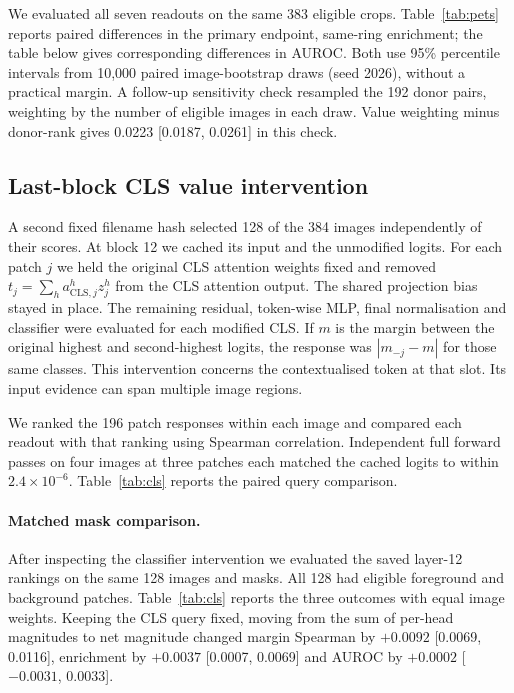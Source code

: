 We evaluated all seven readouts on the same 383 eligible crops. Table~\ref{tab:pets} reports paired differences in the primary endpoint, same-ring enrichment; the table below gives corresponding differences in AUROC. Both use 95\% percentile intervals from 10,000 paired image-bootstrap draws (seed 2026), without a practical margin. A follow-up sensitivity check resampled the 192 donor pairs, weighting by the number of eligible images in each draw. Value weighting minus donor-rank gives 0.0223 [0.0187, 0.0261] in this check.
\begin{center}\begin{minipage}{\linewidth}
\centering\small\setlength{\tabcolsep}{4pt}
\end{minipage}\end{center}

\subsection{Last-block CLS value intervention}
A second fixed filename hash selected 128 of the 384 images independently of their scores. At block 12 we cached its input and the unmodified logits. For each patch $j$ we held the original CLS attention weights fixed and removed $t_j=\sum_h a^h_{\mathrm{CLS},j}z_j^h$ from the CLS attention output. The shared projection bias stayed in place. The remaining residual, token-wise MLP, final normalisation and classifier were evaluated for each modified CLS. If $m$ is the margin between the original highest and second-highest logits, the response was $|m_{-j}-m|$ for those same classes. This intervention concerns the contextualised token at that slot. Its input evidence can span multiple image regions.

We ranked the 196 patch responses within each image and compared each readout with that ranking using Spearman correlation. Independent full forward passes on four images at three patches each matched the cached logits to within $2.4\times10^{-6}$. Table~\ref{tab:cls} reports the paired query comparison.
\paragraph{Matched mask comparison.} After inspecting the classifier intervention we evaluated the saved layer-12 rankings on the same 128 images and masks. All 128 had eligible foreground and background patches. Table~\ref{tab:cls} reports the three outcomes with equal image weights. Keeping the CLS query fixed, moving from the sum of per-head magnitudes to net magnitude changed margin Spearman by $+0.0092$ [0.0069, 0.0116], enrichment by $+0.0037$ [0.0007, 0.0069] and AUROC by $+0.0002$ [$-0.0031$, 0.0033].

